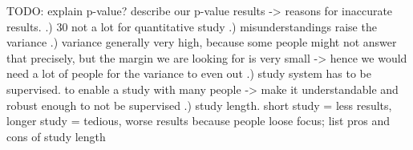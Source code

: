 TODO: explain p-value? describe our p-value results -> reasons for inaccurate results.
.) 30 not a lot for quantitative study
.) misunderstandings raise the variance
.) variance generally very high, because some people might not answer that precisely, but the margin we are looking for is very small -> hence we would need a lot of people for the variance to even out
.) study system has to be supervised. to enable a study with many people -> make it understandable and robust enough to not be supervised
.) study length. short study = less results, longer study = tedious, worse results because people loose focus; list pros and cons of study length
